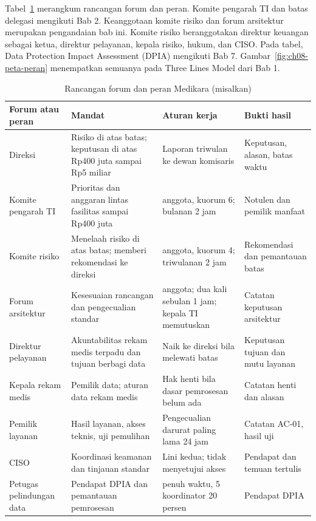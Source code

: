 Tabel~\ref{tab:ch08-forum} merangkum rancangan forum dan peran. Komite pengarah TI dan batas
delegasi mengikuti Bab 2. Keanggotaan komite risiko dan forum arsitektur merupakan pengandaian
bab ini. Komite risiko beranggotakan direktur keuangan sebagai ketua, direktur pelayanan, kepala
risiko, hukum, dan CISO. Pada tabel, Data Protection Impact Assessment (DPIA) mengikuti Bab 7.
Gambar~\ref{fig:ch08-peta-peran} menempatkan semuanya pada Three Lines Model dari Bab 1.

\begin{table}[!htb]
  \centering\small
  \caption{Rancangan forum dan peran Medikara (misalkan)}\label{tab:ch08-forum}
  \begin{tabularx}{\textwidth}{|>{\raggedright\arraybackslash}p{}|>{\raggedright\arraybackslash}X|>{\raggedright\arraybackslash}X|>{\raggedright\arraybackslash}p{}|}
    \hline
    \textbf{Forum atau peran} & \textbf{Mandat} & \textbf{Aturan kerja} & \textbf{Bukti hasil} \\
    \hline
    Direksi & Risiko di atas batas; keputusan di atas Rp400 juta sampai Rp5 miliar & Laporan
    triwulan ke dewan komisaris & Keputusan, alasan, batas waktu \\ \hline
    Komite pengarah TI & Prioritas dan anggaran lintas fasilitas sampai Rp400 juta & 9 anggota,
    kuorum 6; bulanan 2 jam & Notulen dan pemilik manfaat \\ \hline
    Komite risiko & Menelaah risiko di atas batas; memberi rekomendasi ke direksi & 5 anggota,
    kuorum 4; triwulanan 2 jam & Rekomendasi dan pemantauan batas \\ \hline
    Forum arsitektur & Kesesuaian rancangan dan pengecualian standar & 6 anggota; dua kali sebulan
    1 jam; kepala TI memutuskan & Catatan keputusan arsitektur \\ \hline
    Direktur pelayanan & Akuntabilitas rekam medis terpadu dan tujuan berbagi data & Naik ke
    direksi bila melewati batas & Keputusan tujuan dan mutu layanan \\ \hline
    Kepala rekam medis & Pemilik data; aturan data rekam medis & Hak henti bila dasar pemrosesan
    belum ada & Catatan henti dan alasan \\ \hline
    Pemilik layanan & Hasil layanan, akses teknis, uji pemulihan & Pengecualian darurat paling
    lama 24 jam & Catatan AC-01, hasil uji \\ \hline
    CISO & Koordinasi keamanan dan tinjauan standar & Lini kedua; tidak menyetujui akses & Pendapat
    dan temuan tertulis \\ \hline
    Petugas pelindungan data & Pendapat DPIA dan pemantauan pemrosesan & 1 penuh waktu, 5
    koordinator 20 persen & Pendapat DPIA \\ \hline
  \end{tabularx}
\end{table}

